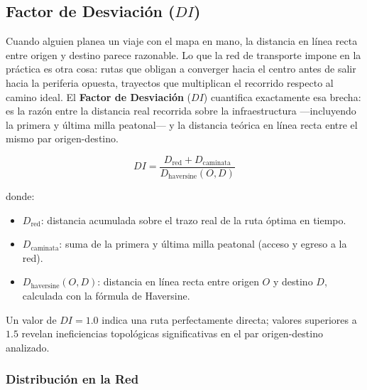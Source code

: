 \subsection{Factor de Desviación (\texorpdfstring{$DI$}{DI})}
\label{subsec:factor-desviacion}

Cuando alguien planea un viaje con el mapa en mano, la distancia en línea recta
entre origen y destino parece razonable. Lo que la red de transporte impone en
la práctica es otra cosa: rutas que obligan a converger hacia el centro antes de
salir hacia la periferia opuesta, trayectos que multiplican el recorrido
respecto al camino ideal. El \textbf{Factor de Desviación} ($DI$) cuantifica
exactamente esa brecha: es la razón entre la distancia real recorrida sobre la
infraestructura —incluyendo la primera y última milla peatonal— y la distancia
teórica en línea recta entre el mismo par origen-destino.

\begin{equation}
    DI = \frac{D_{\text{red}} + D_{\text{caminata}}}
              {D_{\text{haversine}}(O, D)}
    \label{eq:factor-desviacion}
\end{equation}

\noindent donde:
\begin{itemize}
    \item $D_{\text{red}}$: distancia acumulada sobre el trazo real de
          la ruta óptima en tiempo.
    \item $D_{\text{caminata}}$: suma de la primera y última milla
          peatonal (acceso y egreso a la red).
    \item $D_{\text{haversine}}(O, D)$: distancia en línea recta entre
          origen $O$ y destino $D$, calculada con la fórmula de
          Haversine.
\end{itemize}

Un valor de $DI = 1.0$ indica una ruta perfectamente directa; valores superiores
a $1.5$ revelan ineficiencias topológicas significativas en el par
origen-destino analizado.

\subsubsection{Distribución en la Red}
\label{subsubsec:di-distribucion}

